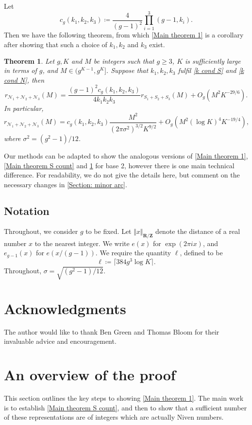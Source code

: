 \documentclass[hidelinks,11pt,reqno]{amsart}
\renewcommand{\geq}{\geqslant}
\newcommand{\Z}{\ensuremath{\mathbf{Z}}}
\newcommand{\R}{\ensuremath{\mathbf{R}}}
\newcommand{\Vertr}{\Vert_{\R/\Z}}
\newcommand{\ru}[1]{e_{g-1}(#1)}
\newtheorem{theorem}[prop]{Theorem}
\theoremstyle{remark}
\newcommand{\nocontentsline}[3]{}
\let\origcontentsline\addcontentsline
\newcommand\stoptoc{\let\addcontentsline\nocontentsline}
\newcommand\resumetoc{\let\addcontentsline\origcontentsline}
\begin{document}
Let 
\[c_{g}(k_{1},k_{2},k_{3})\coloneq \frac{4}{(g-1)^{2}}\prod_{i=1}^{3}(g-1,k_{i}).\]
Then we have the following theorem, from which \cref{Main theorem 1} is a corollary after showing that such a choice of $k_{1},k_{2}$ and $k_{3}$ exist. 
\begin{theorem}\label{Main theorem N count}
Let $g,K$ and $M$ be integers such that $g\geq 3$, $K$ is sufficiently large in terms of $g$, and $M\in (g^{K-1},g^{K}]$. Suppose that $k_{1},k_{2},k_{3}$ fulfil \cref{k cond S} and \cref{k cond N}, then
\[r_{\mathcal{N}_{1}+\mathcal{N}_{2}+\mathcal{N}_{3}}(M)=\frac{(g-1)^{2}c_{g}(k_{1},k_{2},k_{3})}{4k_{1}k_{2}k_{3}}r_{S_{1}+S_{2}+S_{3}}(M)+O_{g}(M^{2}K^{-29/6}).\]
In particular,
 \[r_{\mathcal{N}_{1}+\mathcal{N}_{2}+\mathcal{N}_{3}}(M)=c_{g}(k_{1},k_{2},k_{3})\frac{M^{2}}{(2\pi\sigma^{2})^{3/2}K^{9/2}}+O_{g}(M^{2}(\log K)^{4}K^{-19/4}),\]
 where $\sigma^{2}=(g^{2}-1)/12$.
\end{theorem}
Our methods can be adapted to show the analogous versions of \cref{Main theorem 1}, \cref{Main theorem S count} and \cref{Main theorem N count} for base 2, however there is one main technical difference. For readability, we do not give the details here, but comment on the necessary changes in \cref{Section: minor arc}.
\subsection{Notation}\label{notation}
Throughout, we consider $g$ to be fixed. Let $\Vert x \Vertr$ denote the distance of a real number $x$ to the nearest integer. We write $e(x)$ for $\exp(2\pi ix)$, and $\ru{x}$ for $e(x/(g-1))$. We require the quantity $\ell$, defined to be
\begin{equation}\label{l choice}
    \ell\coloneqq \lceil 384g^{3}\log K\rceil.
\end{equation}
Throughout, $\sigma=\sqrt{(g^{2}-1)/12}.$
\stoptoc
\section*{Acknowledgments}
\resumetoc
The author would like to thank Ben Green and Thomas Bloom for their invaluable advice and encouragement.
\section{An overview of the proof}
This section outlines the key steps to showing \cref{Main theorem 1}. The main work is to establish \cref{Main theorem S count}, and then to show that a sufficient number of these representations are of integers which are actually Niven numbers.
\end{document}
